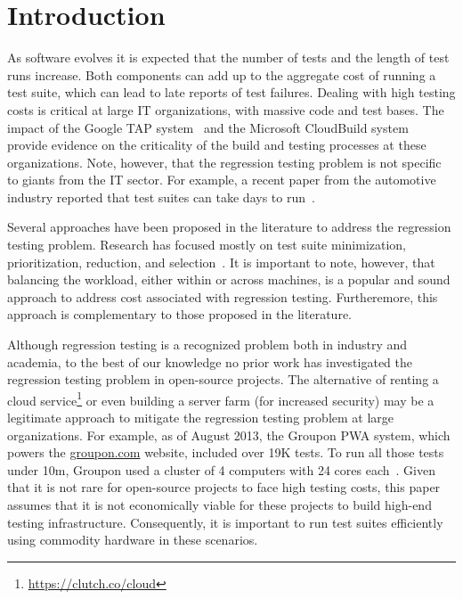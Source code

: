 \section{Introduction}


As software evolves it is expected that the number of tests and the
length of test runs increase.  Both components can add up to the
aggregate cost of running a test suite, which can lead to late reports
of test failures.  Dealing with high testing costs is critical at
large IT organizations, with massive code and test bases.  The impact
of the Google TAP system~\cite{google-tap,google-ci} and the Microsoft
CloudBuild system~\cite{prasad-shulte-ieee-microsoft-ci} provide
evidence on the criticality of the build and testing processes at
these organizations.  Note, however, that the regression testing
problem is not specific to giants from the IT sector.  For example, a
recent paper from the automotive industry reported that test suites
can take days to run~\cite{artl-etal-icst2015}.

Several approaches have been proposed in the literature to address the
regression testing problem.  Research has focused mostly on test suite
minimization, prioritization, reduction, and
selection~\cite{yoo-harman-stvr2012}.  It is important to note,
however, that balancing the workload, either within or across
machines, is a popular and sound approach to address cost associated
with regression testing.  Furtheremore, this approach is complementary
to those proposed in the literature.





Although regression testing is a recognized problem both in industry
and academia, to the best of our knowledge no prior work has
investigated the regression testing problem in open-source projects.
The alternative of renting a cloud
service\footnote{\url{https://clutch.co/cloud}} or even building a
server farm (for increased security) may be a legitimate approach to
mitigate the regression testing problem at large organizations.  For
example, as of August 2013, the Groupon PWA system, which powers the
\url{groupon.com} website, included over 19K tests.  To run all those
tests under 10m, Groupon used a cluster of 4 computers with 24 cores
each~\cite{kim-etal-fse2013}.  Given that it is not rare for
open-source projects to face high testing costs, this paper assumes
that it is not economically viable for these projects to build
high-end testing infrastructure.  Consequently, it is important to run
test suites efficiently using commodity hardware in these scenarios.

